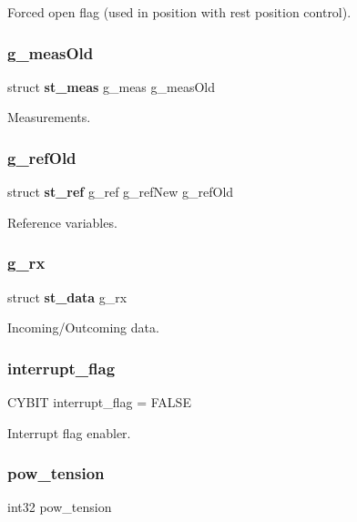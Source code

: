 Forced open flag (used in position with rest position control). \mbox{\label{globals_8c_a47c3980e6bddec492ca4315e36602ba0}} 
\subsubsection{g\+\_\+meas\+Old}
{\footnotesize\ttfamily struct \textbf{ st\+\_\+meas} g\+\_\+meas g\+\_\+meas\+Old}

Measurements. \mbox{\label{globals_8c_a158d26b6d15050b37d8039881d75e0dc}} 
\subsubsection{g\+\_\+ref\+Old}
{\footnotesize\ttfamily struct \textbf{ st\+\_\+ref} g\+\_\+ref g\+\_\+ref\+New g\+\_\+ref\+Old}

Reference variables. \mbox{\label{globals_8c_aa963ce8fafc11e104eb7ee22982d0345}} 
\subsubsection{g\+\_\+rx}
{\footnotesize\ttfamily struct \textbf{ st\+\_\+data} g\+\_\+rx}

Incoming/\+Outcoming data. \mbox{\label{globals_8c_a1e6fda88dfdabc63859f8907eb702920}} 
\subsubsection{interrupt\+\_\+flag}
{\footnotesize\ttfamily C\+Y\+B\+IT interrupt\+\_\+flag = F\+A\+L\+SE}

Interrupt flag enabler. \mbox{\label{globals_8c_a63d713ff9ac5ba0651f6af9115a32e4d}} 
\subsubsection{pow\+\_\+tension}
{\footnotesize\ttfamily int32 pow\+\_\+tension}

